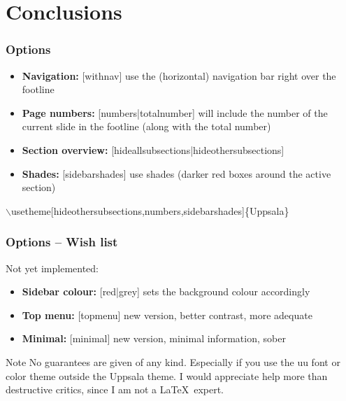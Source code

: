 \documentclass{beamer}
\begin{document}
\section{Conclusions}

\begin{frame}
  \frametitle{Options}

  \begin{itemize}
    \item{\textbf{Navigation:} [withnav] use the (horizontal) navigation bar right over the footline}
    \item{\textbf{Page numbers:} [numbers|totalnumber] will include the number of the current slide in the footline (along with the total number)}
    \item{\textbf{Section overview:} [hideallsubsections|hideothersubsections]}
    \item{\textbf{Shades:} [sidebarshades] use shades (darker red boxes around the active section)}
  \end{itemize}

    \begin{example}[My favorite]
      {\footnotesize{
	  $\backslash$usetheme[hideothersubsections,numbers,sidebarshades]\{Uppsala\}
      }}
  \end{example}

\end{frame}

\begin{frame}
  \frametitle{Options -- Wish list}
  Not yet implemented:
  \begin{itemize}
    \item{\textbf{Sidebar colour:} [red|grey] sets the background colour accordingly}
    \item{\textbf{Top menu:} [topmenu] new version, better contrast, more adequate}
    \item{\textbf{Minimal:} [minimal] new version, minimal information, sober}
  \end{itemize}

  \begin{alertblock}{Note}
    No guarantees are given of any kind. Especially if you use the uu font or
    color theme outside the Uppsala theme.
    \vskip 5mm 
    I would appreciate help more than destructive critics, since I am not a
    \LaTeX\ expert.
  \end{alertblock}
  

\end{frame}
\end{document}
